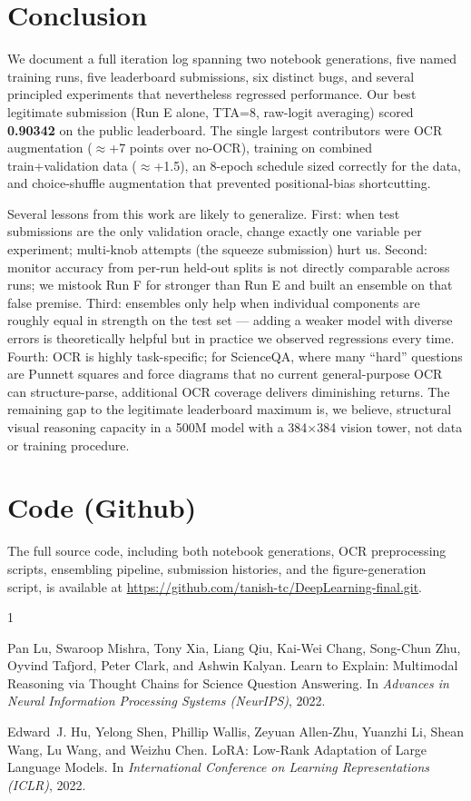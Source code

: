 \documentclass[11pt]{article}
\begin{document}
\section{Conclusion}

We document a full iteration log spanning two notebook generations, five named training runs, five leaderboard submissions, six distinct bugs, and several principled experiments that nevertheless regressed performance. Our best legitimate submission (Run E alone, TTA=8, raw-logit averaging) scored \textbf{0.90342} on the public leaderboard. The single largest contributors were OCR augmentation ($\approx$+7 points over no-OCR), training on combined train+validation data ($\approx$+1.5), an 8-epoch schedule sized correctly for the data, and choice-shuffle augmentation that prevented positional-bias shortcutting.

Several lessons from this work are likely to generalize. First: when test submissions are the only validation oracle, change exactly one variable per experiment; multi-knob attempts (the squeeze submission) hurt us. Second: monitor accuracy from per-run held-out splits is not directly comparable across runs; we mistook Run F for stronger than Run E and built an ensemble on that false premise. Third: ensembles only help when individual components are roughly equal in strength on the test set --- adding a weaker model with diverse errors is theoretically helpful but in practice we observed regressions every time. Fourth: OCR is highly task-specific; for ScienceQA, where many ``hard'' questions are Punnett squares and force diagrams that no current general-purpose OCR can structure-parse, additional OCR coverage delivers diminishing returns. The remaining gap to the legitimate leaderboard maximum is, we believe, structural visual reasoning capacity in a 500M model with a 384$\times$384 vision tower, not data or training procedure.

\section*{Code (Github)}
The full source code, including both notebook generations, OCR preprocessing scripts, ensembling pipeline, submission histories, and the figure-generation script, is available at \url{https://github.com/tanish-tc/DeepLearning-final.git}.


\begin{thebibliography}{1}

Pan Lu, Swaroop Mishra, Tony Xia, Liang Qiu, Kai-Wei Chang, Song-Chun Zhu, Oyvind Tafjord, Peter Clark, and Ashwin Kalyan.
\newblock Learn to Explain: Multimodal Reasoning via Thought Chains for Science Question Answering.
\newblock In \emph{Advances in Neural Information Processing Systems (NeurIPS)}, 2022.

Edward~J. Hu, Yelong Shen, Phillip Wallis, Zeyuan Allen-Zhu, Yuanzhi Li, Shean Wang, Lu Wang, and Weizhu Chen.
\newblock LoRA: Low-Rank Adaptation of Large Language Models.
\newblock In \emph{International Conference on Learning Representations (ICLR)}, 2022.

\end{thebibliography}
\end{document}
